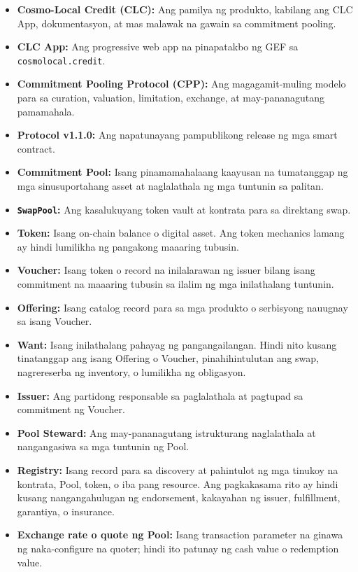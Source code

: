 \documentclass[11pt]{article}
\begin{document}
\begin{itemize}[leftmargin=*]
\item \textbf{Cosmo-Local Credit (CLC):} Ang pamilya ng produkto, kabilang ang CLC App, dokumentasyon, at mas malawak na gawain sa commitment pooling.
\item \textbf{CLC App:} Ang progressive web app na pinapatakbo ng GEF sa \texttt{cosmolocal.credit}.
\item \textbf{Commitment Pooling Protocol (CPP):} Ang magagamit-muling modelo para sa curation, valuation, limitation, exchange, at may-pananagutang pamamahala.
\item \textbf{Protocol v1.1.0:} Ang napatunayang pampublikong release ng mga smart contract.
\item \textbf{Commitment Pool:} Isang pinamamahalaang kaayusan na tumatanggap ng mga sinusuportahang asset at naglalathala ng mga tuntunin sa palitan.
\item \textbf{\texttt{SwapPool}:} Ang kasalukuyang token vault at kontrata para sa direktang swap.
\item \textbf{Token:} Isang on-chain balance o digital asset. Ang token mechanics lamang ay hindi lumilikha ng pangakong maaaring tubusin.
\item \textbf{Voucher:} Isang token o record na inilalarawan ng issuer bilang isang commitment na maaaring tubusin sa ilalim ng mga inilathalang tuntunin.
\item \textbf{Offering:} Isang catalog record para sa mga produkto o serbisyong nauugnay sa isang Voucher.
\item \textbf{Want:} Isang inilathalang pahayag ng pangangailangan. Hindi nito kusang tinatanggap ang isang Offering o Voucher, pinahihintulutan ang swap, nagrereserba ng inventory, o lumilikha ng obligasyon.
\item \textbf{Issuer:} Ang partidong responsable sa paglalathala at pagtupad sa commitment ng Voucher.
\item \textbf{Pool Steward:} Ang may-pananagutang istrukturang naglalathala at nangangasiwa sa mga tuntunin ng Pool.
\item \textbf{Registry:} Isang record para sa discovery at pahintulot ng mga tinukoy na kontrata, Pool, token, o iba pang resource. Ang pagkakasama rito ay hindi kusang nangangahulugan ng endorsement, kakayahan ng issuer, fulfillment, garantiya, o insurance.
\item \textbf{Exchange rate o quote ng Pool:} Isang transaction parameter na ginawa ng naka-configure na quoter; hindi ito patunay ng cash value o redemption value.

\end{itemize}
\end{document}
